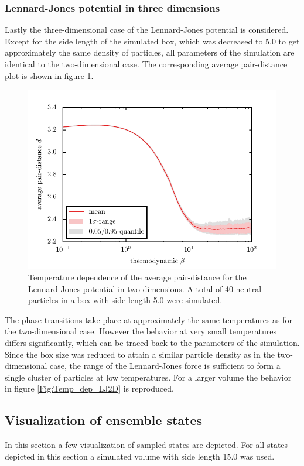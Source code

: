 \documentclass[11pt, a4paper]{article}
\numberwithin{equation}{section}
\begin{document}
\subsubsection{Lennard-Jones potential in three dimensions}
Lastly the three-dimensional case of the Lennard-Jones potential is considered.
Except for the side length of the simulated box, which was decreased to 5.0 to get approximately the same density of particles, all parameters of the simulation are identical to the two-dimensional case.
The corresponding average pair-distance plot is shown in figure \ref{Fig:Temp_dep_LJ3D}.
\begin{figure}
	\centering
	\includegraphics{./figures/temp_dep_lennard_jones3d.pdf}
	\caption{Temperature dependence of the average pair-distance for the Lennard-Jones potential in two dimensions.
		A total of 40 neutral particles in a box with side length 5.0 were simulated.}
	\label{Fig:Temp_dep_LJ3D}
\end{figure}

The phase transitions take place at approximately the same temperatures as for the two-dimensional case.
However the behavior at very small temperatures differs significantly, which can be traced back to the parameters of the simulation.
Since the box size was reduced to attain a similar particle density as in the two-dimensional case, the range of the Lennard-Jones force is sufficient to form a single cluster of particles at low temperatures.
For a larger volume the behavior in figure \ref{Fig:Temp_dep_LJ2D} is reproduced.

\subsection{Visualization of ensemble states} \label{sec:Visualisation}
In this section a few visualization of sampled states are depicted.
For all states depicted in this section a simulated volume with side length 15.0 was used.
\end{document}
